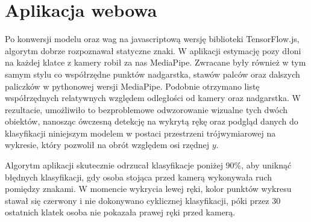 \section{Aplikacja webowa}
\label{sec:web-application}

Po konwersji modelu oraz wag na javascriptową wersję biblioteki TensorFlow.js, algorytm dobrze rozpoznawał statyczne znaki. W aplikacji estymację pozy dłoni na każdej klatce z kamery robił za nas MediaPipe. Zwracane były również w tym samym stylu co współrzędne punktów nadgarstka, stawów palców oraz dalszych paliczków w pythonowej wersji MediaPipe. Podobnie otrzymano listę współrzędnych relatywnych względem odległości od kamery oraz nadgarstka. W rezultacie, umożliwiło to bezproblemowe odwzorowanie wizualne tych dwóch obiektów, nanosząc ówczesną detekcję na wykrytą rękę oraz podgląd danych do klasyfikacji niniejszym modelem w postaci przestrzeni trójwymiarowej na wykresie, który pozwolił na obrót względem osi rzędnej $y$.

Algorytm aplikacji skutecznie odrzucał klasyfikacje poniżej 90\%, aby uniknąć błędnych klasyfikacji, gdy osoba stojąca przed kamerą wykonywała ruch pomiędzy znakami. W momencie wykrycia lewej ręki, kolor punktów wykresu stawał się czerwony i nie dokonywano cyklicznej klasyfikacji, póki przez 30 ostatnich klatek osoba nie pokazała prawej ręki przed kamerą.


